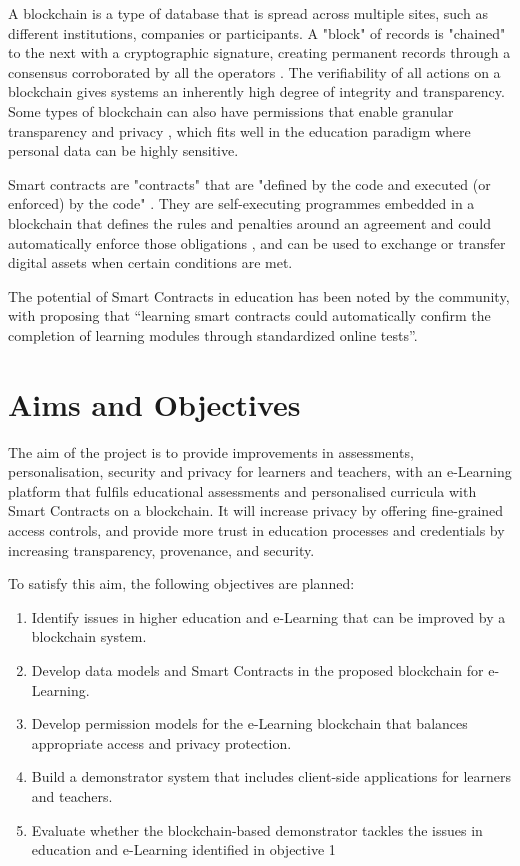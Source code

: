 A blockchain is a type of database that is spread across multiple sites, such as different institutions, companies
or participants. A "block" of records is "chained" to the next with a cryptographic signature, creating permanent records
through a consensus corroborated by all the operators \citep[p.17]{walport2016distributed}.
The verifiability of all actions on a blockchain gives systems an inherently high degree of integrity and transparency.
Some types of blockchain can also have permissions that enable granular transparency and privacy \citep[p.22]{walport2016distributed},
which fits well in the education paradigm where personal data can be highly sensitive.

Smart contracts are "contracts" that are "defined by the code and executed (or enforced) by the code" \citep[p.16]{swan2015blockchain}.
They are self-executing programmes embedded in a blockchain that defines the rules and penalties around an agreement and could automatically enforce
those obligations \citep{gulhane2017ibm}, and can be used to exchange or transfer digital assets when certain conditions are met.

The potential of Smart Contracts in education has been noted by the community, with \citet[p.62]{swan2015blockchain}
proposing that “learning smart contracts could automatically confirm the completion of learning modules through standardized
online tests”.

\section{Aims and Objectives} %

The aim of the project is to provide improvements in assessments, personalisation, security and privacy 
for learners and teachers, with an e-Learning platform that fulfils educational assessments
and personalised curricula with Smart Contracts on a blockchain. It will increase privacy by offering 
fine-grained access controls, and provide more trust in education processes and credentials by 
increasing transparency, provenance, and security.

To satisfy this aim, the following objectives are planned:
\begin{enumerate}
	\setlength\itemsep{0em}
	\item Identify issues in higher education and e-Learning that can be improved by a blockchain system.
	\item Develop data models and Smart Contracts in the proposed blockchain for e-Learning.
	\item Develop permission models for the e-Learning blockchain that balances appropriate access and privacy protection.
	\item Build a demonstrator system that includes client-side applications for learners and teachers.
	\item Evaluate whether the blockchain-based demonstrator tackles the issues in education and e-Learning identified in objective 1
\end{enumerate}


